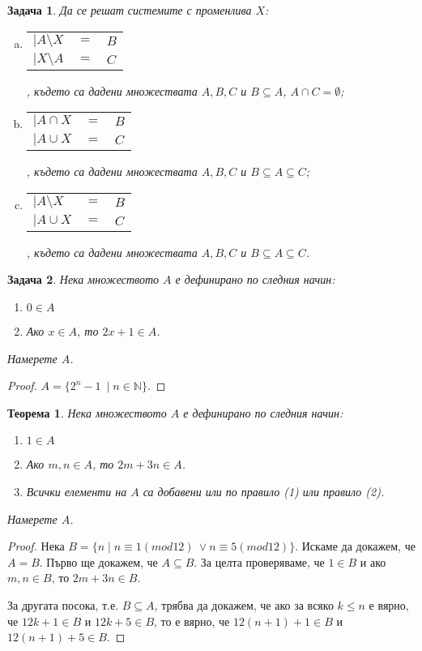 \documentclass[a4paper]{article}
\newtheorem{thm}{Теорема}
\newtheorem{problem}{Задача}
\newcommand{\N}{\mathbb{N}}
\begin{document}
\begin{problem}
  Да се решат системите с променлива $X$:
  \begin{enumerate}[(a)]
  \item
    \begin{tabular}{l c l}
      $\big|A\setminus X$ & $= $ & $ B$\\
      $\big|X\setminus A $ & $=$ & $ C$
    \end{tabular}, където са дадени множествата $A,B,C$ и $B\subseteq A$, $A\cap C = \emptyset$;
  \item
    \begin{tabular}{l c l}
      $\big|A\cap X$ & $= $ & $ B$\\
      $\big|A\cup X $ & $=$ & $ C$
    \end{tabular}, където са дадени множествата $A,B,C$ и $B\subseteq A\subseteq C$;
  \item
    \begin{tabular}{l c l}
      $\big|A\setminus X$ & $= $ & $ B$\\
      $\big|A\cup X $ & $=$ & $ C$
    \end{tabular}, където са дадени множествата $A,B,C$ и $B\subseteq A\subseteq C$.
  \end{enumerate}
\end{problem}



\begin{problem}
  Нека множеството $A$ е дефинирано по следния начин:
  \begin{enumerate}
  \item
    $0\in A$
  \item
    Ако $x\in A$, то $2x+1 \in A$.
\end{enumerate}
Намерете $A$.
\end{problem}
\begin{proof}
  $A = \{2^n - 1\ \mid n\in\N\}$.
\end{proof}

\begin{thm}
  Нека множеството $A$ е дефинирано по следния начин:
  \begin{enumerate}[(1)]
  \item
    $1\in A$
  \item
    Ако $m,n\in A$, то $2m+3n \in A$.
  \item
    Всички елементи на $A$ са добавени или по правило (1) или правило (2).
\end{enumerate}
Намерете $A$.
\end{thm}
\begin{proof}
  Нека $B = \{n \mid n\equiv 1 (mod 12)\ \vee n\equiv 5 (mod 12) \}$.
  Искаме да докажем, че $A = B$.
  Първо ще докажем, че $A\subseteq B$.
  За целта проверяваме, че $1\in B$ и ако $m,n \in B$, то $2m+3n \in B$.
  
  За другата посока, т.е. $B\subseteq A$, трябва да докажем, че ако
  за всяко $k\leq n$ е вярно, че $12k+1 \in B$ и $12k + 5 \in B$,
  то е вярно, че $12(n+1)+1 \in B $ и $12(n+1) + 5 \in B$.
\end{proof}
\end{document}
